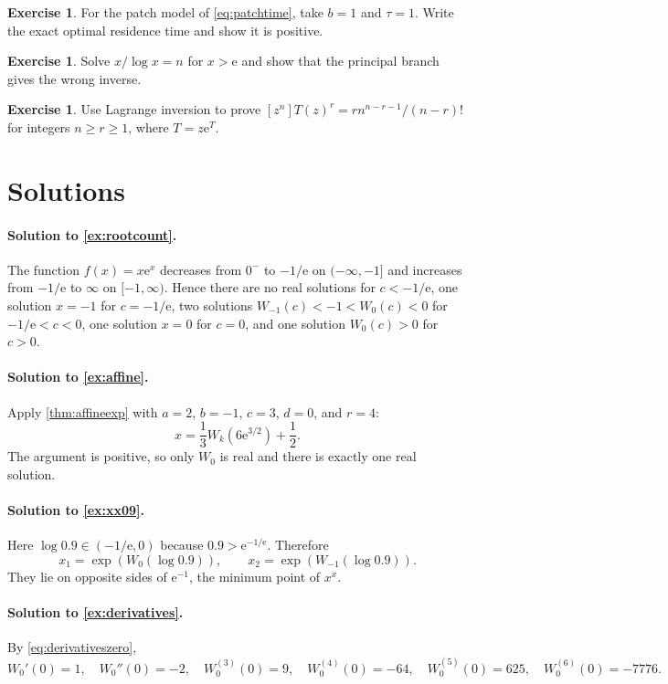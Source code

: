 \documentclass[11pt,oneside]{book}
\theoremstyle{definition}
\newtheorem{exercise}[theorem]{Exercise}
\theoremstyle{remark}
\newcommand{\ee}{\mathrm e}
\begin{document}
\begin{exercise}\label{ex:patch}
For the patch model of \eqref{eq:patchtime}, take $b=1$ and $\tau=1$.
Write the exact optimal residence time and show it is positive.
\end{exercise}

\begin{exercise}\label{ex:primeinverse}
Solve $x/\log x=n$ for $x>\ee$ and show that the principal branch gives the
wrong inverse.
\end{exercise}

\begin{exercise}\label{ex:treecoeff}
Use Lagrange inversion to prove
$[z^n]T(z)^r=r n^{n-r-1}/(n-r)!$ for integers $n\ge r\ge1$, where
$T=z\ee^T$.
\end{exercise}

\section{Solutions}

\paragraph{Solution to \cref{ex:rootcount}.}
The function $f(x)=x\ee^x$ decreases from $0^-$ to $-1/\ee$ on
$(-\infty,-1]$ and increases from $-1/\ee$ to $\infty$ on
$[-1,\infty)$.  Hence there are no real solutions for $c<-1/\ee$, one
solution $x=-1$ for $c=-1/\ee$, two solutions
$W_{-1}(c)<-1<W_0(c)<0$ for $-1/\ee<c<0$, one solution $x=0$ for $c=0$,
and one solution $W_0(c)>0$ for $c>0$.

\paragraph{Solution to \cref{ex:affine}.}
Apply \cref{thm:affineexp} with
$a=2$, $b=-1$, $c=3$, $d=0$, and $r=4$:
\[
 x=\frac13W_k\!\left(6\ee^{3/2}\right)+\frac12.
\]
The argument is positive, so only $W_0$ is real and there is exactly one real
solution.

\paragraph{Solution to \cref{ex:xx09}.}
Here $\log0.9\in(-1/\ee,0)$ because $0.9>\ee^{-1/\ee}$.  Therefore
\[
 x_1=\exp(W_0(\log0.9)),
 \qquad
 x_2=\exp(W_{-1}(\log0.9)).
\]
They lie on opposite sides of $\ee^{-1}$, the minimum point of $x^x$.

\paragraph{Solution to \cref{ex:derivatives}.}
By \eqref{eq:derivativeszero},
\[
 W_0'(0)=1,
 \quad W_0''(0)=-2,
 \quad W_0^{(3)}(0)=9,
 \quad W_0^{(4)}(0)=-64,
 \quad W_0^{(5)}(0)=625,
 \quad W_0^{(6)}(0)=-7776.
\]
\end{document}
